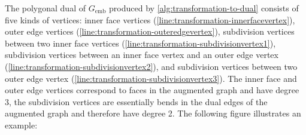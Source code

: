 The polygonal dual of $G_\text{emb}$ produced by \cref{alg:transformation-to-dual} consists of five kinds of vertices: inner face vertices (\cref{line:transformation-innerfacevertex}), outer edge vertices (\cref{line:transformation-outeredgevertex}), subdivision vertices between two inner face vertices (\cref{line:transformation-subdivisionvertex1}), subdivision vertices between an inner face vertex and an outer edge vertex (\cref{line:transformation-subdivisionvertex2}), and subdivision vertices between two outer edge vertex (\cref{line:transformation-subdivisionvertex3}). The inner face and outer edge vertices correspond to faces in the augmented graph and have degree 3, the subdivision vertices are essentially bends in the dual edges of the augmented graph and therefore have degree 2. The following figure illustrates an example:
%
\begin{figure}[H]
	\centering
	\quad
	\quad

\end{figure}
